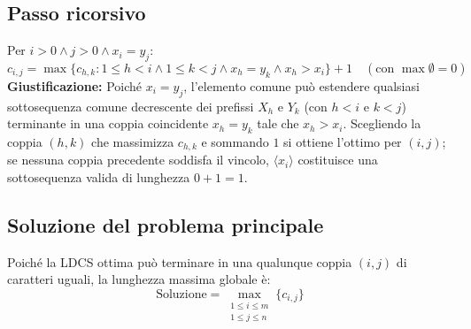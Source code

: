 \subsection{Passo ricorsivo}
Per $i > 0 \land j > 0 \land x_i = y_j$:
\[
    c_{i,j} = \max \{ c_{h, k} : 1 \le h < i \land 1 \le k < j \land x_h = y_k \land x_h > x_i \} + 1 \quad (\text{con } \max \emptyset = 0)
\]
\textbf{Giustificazione:} Poiché $x_i = y_j$, l'elemento comune può estendere qualsiasi sottosequenza comune decrescente dei prefissi $X_h$ e $Y_k$ (con $h < i$ e $k < j$) terminante in una coppia coincidente $x_h = y_k$ tale che $x_h > x_i$. Scegliendo la coppia $(h, k)$ che massimizza $c_{h,k}$ e sommando $1$ si ottiene l'ottimo per $(i, j)$; se nessuna coppia precedente soddisfa il vincolo, $\langle x_i \rangle$ costituisce una sottosequenza valida di lunghezza $0 + 1 = 1$.

\subsection{Soluzione del problema principale}
Poiché la LDCS ottima può terminare in una qualunque coppia $(i, j)$ di caratteri uguali, la lunghezza massima globale è:
\[
    \text{Soluzione} = \max_{\substack{1 \le i \le m \\ 1 \le j \le n}} \{ c_{i,j} \}
\]

